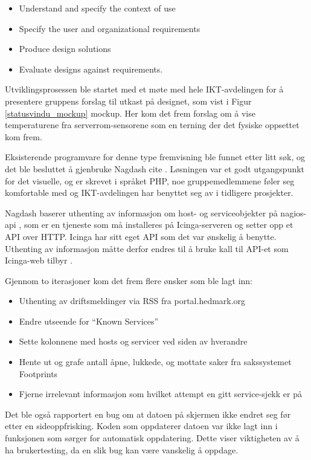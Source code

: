 \begin{itemize}
	\item Understand and specify the context of use
	\item Specify the user and organizational requirements
	\item Produce design solutions
	\item Evaluate designs against requirements.
\end{itemize}

Utviklingsprosessen ble startet med et møte med hele IKT-avdelingen for å presentere gruppens forslag til utkast på designet, som vist i Figur \ref{statusvindu_mockup} mockup. Her kom det frem forslag om å vise temperaturene fra serverrom-sensorene som en terning der det fysiske oppsettet kom frem.

Eksisterende programvare for denne type fremvisning ble funnet etter litt søk, og det ble besluttet å gjenbruke Nagdash cite \cite{nagdash}. Løsningen var et godt utgangspunkt for det visuelle, og er skrevet i språket PHP, noe gruppemedlemmene føler seg komfortable med og IKT-avdelingen har benyttet seg av i tidligere prosjekter. 

Nagdash baserer uthenting av informasjon om host- og serviceobjekter på nagios-api \cite{nagiosapi}, som er en tjeneste som må installeres på Icinga-serveren og setter opp et API over HTTP. Icinga har sitt eget API som det var ønskelig å benytte. Uthenting av informasjon måtte derfor endres til å bruke kall til API-et som Icinga-web tilbyr \cite{icingarestapi}.

Gjennom to iterasjoner kom det frem flere ønsker som ble lagt inn:
\begin{itemize}
	 \item Uthenting av driftsmeldinger via RSS fra portal.hedmark.org
	 \item Endre utseende for “Known Services”
	 \item Sette kolonnene med hosts og servicer ved siden av hverandre 
	 \item Hente ut og grafe antall åpne, lukkede, og mottate saker fra sakssystemet Footprints
	 \item Fjerne irrelevant informasjon som hvilket attempt en gitt service-sjekk er på
\end{itemize}

Det ble også rapportert en bug om at datoen på skjermen ikke endret seg før etter en sideoppfrisking. Koden som oppdaterer datoen var ikke lagt inn i funksjonen som sørger for automatisk oppdatering. Dette viser viktigheten av å ha brukertesting, da en slik bug kan være vanskelig å oppdage.

